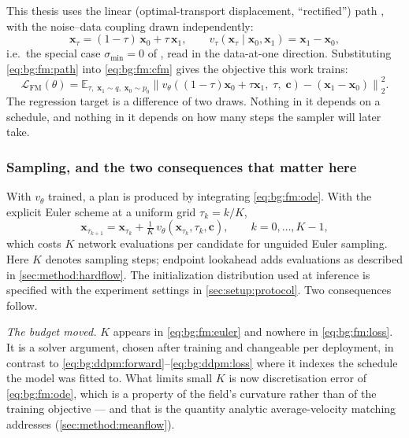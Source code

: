 \documentclass[headsepline,footsepline,footinclude=false,oneside,fontsize=11pt,paper=a4,listof=totoc,bibliography=totoc]{scrbook}
\theoremstyle{definition}
\theoremstyle{plain}
\theoremstyle{remark}
\newcommand{\vect}[1]{\boldsymbol{#1}}
\newcommand{\sidx}[1]{_{\textrm{#1}}}
\newcommand{\E}{\mathbb{E}}                    %
\newcommand{\vfield}{v}                        %
\newcommand{\ftime}{\tau}                      %
\newcommand{\nfe}{K}                           %
\begin{document}
This thesis uses the linear (optimal-transport displacement, ``rectified'')
path \parencite{lipman2023flow,liu2023flow}, with the noise--data coupling drawn independently:
\begin{equation}\label{eq:bg:fm:path}
  \vect{x}_{\ftime} = (1-\ftime)\,\vect{x}_{0} + \ftime\,\vect{x}_{1},
  \qquad
  \vfield_{\ftime}(\vect{x}_{\ftime}\mid \vect{x}_{0},\vect{x}_{1}) = \vect{x}_{1} - \vect{x}_{0},
\end{equation}
i.e.\ the special case $\sigma\sidx{min} = 0$ of \parencite[Eq.~(20)--(23)]{lipman2023flow}, read in
the data-at-one direction. Substituting \eqref{eq:bg:fm:path} into \eqref{eq:bg:fm:cfm} gives
the objective this work trains:
\begin{equation}\label{eq:bg:fm:loss}\label{eq:method:engine:fm}
  \mathcal{L}\sidx{FM}(\theta)
  = \E_{\ftime,\;\vect{x}_{1}\sim q,\;\vect{x}_{0}\sim p_{0}}
    \left\|\vfield_{\theta}\!\left((1-\ftime)\vect{x}_{0} + \ftime\vect{x}_{1},\;\ftime,\;\vect{c}\right)
      - \left(\vect{x}_{1}-\vect{x}_{0}\right)\right\|_{2}^{2}.
\end{equation}
The regression target is a difference of two draws. Nothing in it depends on a schedule, and
nothing in it depends on how many steps the sampler will later take.

\subsubsection*{Sampling, and the two consequences that matter here}

With $\vfield_{\theta}$ trained, a plan is produced by integrating \eqref{eq:bg:fm:ode}. With
the explicit Euler scheme at a uniform grid $\ftime_{k} = k/\nfe$,
\begin{equation}\label{eq:bg:fm:euler}
  \vect{x}_{\ftime_{k+1}} = \vect{x}_{\ftime_{k}}
    + \tfrac{1}{\nfe}\,\vfield_{\theta}\!\left(\vect{x}_{\ftime_{k}},\ftime_{k},\vect{c}\right),
  \qquad k = 0,\dots,\nfe-1,
\end{equation}
which costs $\nfe$ network evaluations per candidate for unguided Euler sampling. Here $\nfe$
denotes sampling steps; endpoint lookahead adds evaluations as described in
\autoref{sec:method:hardflow}. The initialization distribution used at inference is specified with
the experiment settings in \autoref{sec:setup:protocol}. Two consequences follow.

\emph{The budget moved.} $\nfe$ appears in \eqref{eq:bg:fm:euler} and nowhere in
\eqref{eq:bg:fm:loss}. It is a solver argument, chosen after training and changeable per
deployment, in contrast to \eqref{eq:bg:ddpm:forward}--\eqref{eq:bg:ddpm:loss} where it
indexes the schedule the model was fitted to. What limits small $\nfe$ is now discretisation
error of \eqref{eq:bg:fm:ode}, which is a property of the field's curvature rather than of the
training objective --- and that is the quantity analytic average-velocity matching addresses
(\autoref{sec:method:meanflow}).
\end{document}
